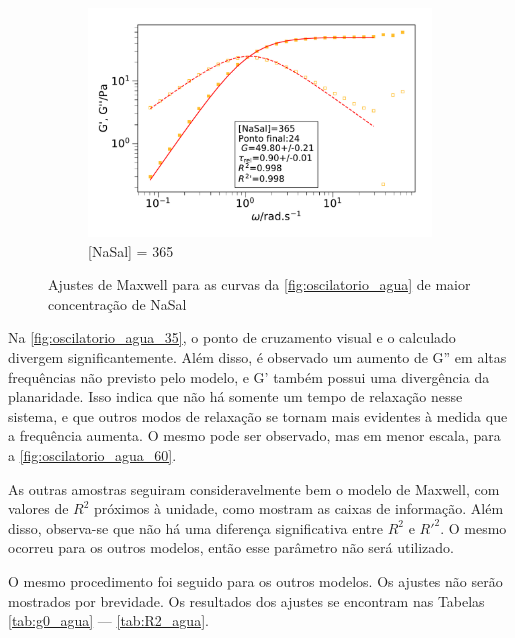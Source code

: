 \begin{figure}[h]
		\centering	\begin{subfigure}[t]{0.5\textwidth}
				\includegraphics[width=\textwidth]{imagens/reologia/oscilatorio_agua_365}
				\caption{[NaSal] = 365 \mM}
				\label{fig:oscilatorio_agua_365}
			\end{subfigure} 
		
			\caption{Ajustes de Maxwell para as curvas da \autoref{fig:oscilatorio_agua} de maior concentração de NaSal}
			\label{fig:oscilatorio_agua_maxwell2}
		\end{figure}
	
		Na \autoref{fig:oscilatorio_agua_35}, o ponto de cruzamento visual e o calculado divergem significantemente. Além disso, é observado um aumento de G'' em altas frequências não previsto pelo modelo, e G' também possui uma divergência da planaridade. Isso indica que não há somente um tempo de relaxação nesse sistema, e que outros modos de relaxação se tornam mais evidentes à medida que a frequência aumenta. O mesmo pode ser observado, mas em menor escala, para a \autoref{fig:oscilatorio_agua_60}.
		
		As outras amostras seguiram consideravelmente bem o modelo de Maxwell, com valores de \(R^2\) próximos à unidade, como mostram as caixas de informação. Além disso, observa-se que não há uma diferença significativa entre \(R^2\) e \(R\mathrm{'}^2\). O mesmo ocorreu para os outros modelos, então esse parâmetro não será utilizado.
		
		O mesmo procedimento foi seguido para os outros modelos. Os ajustes não serão mostrados por brevidade. Os resultados dos ajustes se encontram nas Tabelas \ref{tab:g0_agua} --- \ref{tab:R2_agua}.
		
